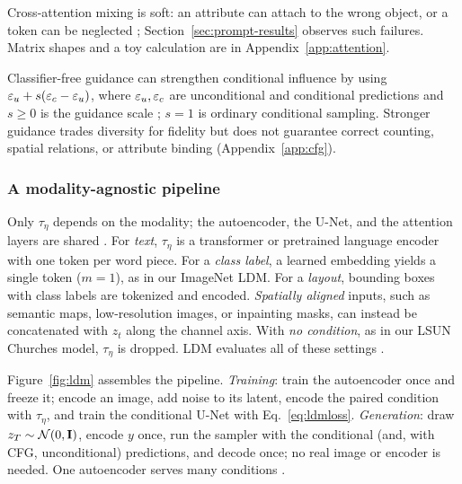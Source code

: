 Cross-attention mixing is soft: an attribute can attach to the wrong object, or a token can be
neglected \cite{chefer2023attend}; Section~\ref{sec:prompt-results}
observes such failures. Matrix shapes and a toy calculation are in
Appendix~\ref{app:attention}.

Classifier-free guidance can strengthen conditional influence by using
$\varepsilon_u+s(\varepsilon_c-\varepsilon_u)$, where $\varepsilon_u,\varepsilon_c$ are unconditional and
conditional predictions and $s\ge0$ is the guidance scale
\cite{ho2022cfg}; $s=1$ is ordinary conditional sampling. Stronger
guidance trades diversity for fidelity but does not guarantee correct
counting, spatial relations, or attribute binding (Appendix~\ref{app:cfg}).

\subsubsection{A modality-agnostic pipeline}\label{sec:fullpipeline}
Only $\tau_\eta$ depends on the modality; the autoencoder, the U-Net, and
the attention layers are shared \cite[Sec.~3.3]{rombach2022ldm}. For
\emph{text}, $\tau_\eta$ is a transformer or pretrained language encoder
with one token per word piece. For a \emph{class label}, a learned
embedding yields a single token ($m=1$), as in our ImageNet LDM. For a
\emph{layout}, bounding boxes with class labels are tokenized and
encoded. \emph{Spatially aligned} inputs, such as semantic maps,
low-resolution images, or inpainting masks, can instead be concatenated
with $z_t$ along the channel axis. With \emph{no condition}, as in our
LSUN Churches model, $\tau_\eta$ is dropped. LDM evaluates all of these
settings \cite[Secs.~4.3--4.5]{rombach2022ldm}.

Figure~\ref{fig:ldm} assembles the pipeline. \emph{Training}: train the
autoencoder once and freeze it; encode an image, add noise to its latent,
encode the paired condition with $\tau_\eta$, and train the conditional
U-Net with Eq.~\eqref{eq:ldmloss}. \emph{Generation}: draw
$z_T\sim\mathcal{N}(0,\mathbf{I})$, encode $y$ once, run the sampler with the
conditional (and, with CFG, unconditional) predictions, and decode once;
no real image or encoder is needed. One autoencoder serves many
conditions \cite[Sec.~1]{rombach2022ldm}.

